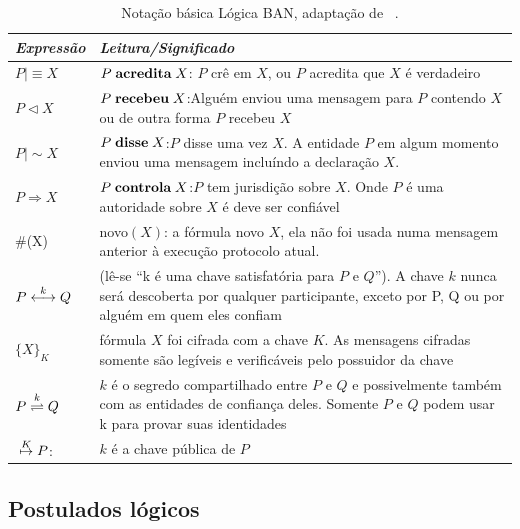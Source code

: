 \begin{table}[h]
\begin{center}
    \begin{tabular}{|l|p{10cm}|}
    \hline
    \textbf{\emph{Expressão }}         & \textbf{\emph{Leitura/Significado}}                                                                               \\ \hline
    ${P}\mid\equiv{X}$               & ${P}\mathrel{\textbf{acredita}}{X}$: $P$ crê em $X$, ou $P$ acredita que $X$ é verdadeiro \\ \hline
    ${P}\triangleleft{X}$            & ${P}\mathrel{\textbf{recebeu}}{X}$:Alguém enviou uma mensagem para $P$ contendo $X$ ou de outra forma $P$ recebeu $X$   \\ \hline
    ${P}\mid\sim{X}$                 & ${P}\mathrel{\textbf{disse}}{X}$:$P$ disse uma vez $X$. A entidade $P$ em algum momento enviou uma mensagem incluíndo a declaração $X$.\\ \hline
    ${P}\Rightarrow {X}$                 & ${P}\mathrel{\textbf{controla}}{X}$:$P$ tem jurisdição sobre $X$. Onde $P$ é uma autoridade sobre $X$ é deve ser confiável \\ \hline
    \#(X)                            & novo$(X)$: a fórmula novo $X$, ela não foi usada numa mensagem anterior à execução protocolo atual.  \\ \hline
    ${P}\stackrel{k}{\longleftrightarrow}{Q}$                & (lê-se ``k é uma chave satisfatória para $P$ e $Q$''). A chave $k$ nunca será descoberta por qualquer participante, exceto por P, Q ou por alguém em quem eles confiam \\ \hline
    $\{{X}\}_K$                  & fórmula $X$ foi cifrada com a chave $K$. As mensagens cifradas somente são legíveis e verificáveis pelo possuidor da chave \\ \hline
    ${P}\stackrel{k}{\rightleftharpoons}{Q}$         & ${k}$ é o segredo compartilhado entre ${P}$ e ${Q}$ e possivelmente também com as entidades de confiança deles. Somente ${P}$ e ${Q}$ podem usar k para provar suas identidades \\ \hline
    ${}\stackrel{K}{\mapsto}{P}$:               & ${k}$ é a chave pública de ${P}$  \\ \hline
    \end{tabular}
    \caption {Notação básica Lógica BAN, adaptação de ~\cite{Burrows1990}.}
\label{tab:notacaobasicaBAN}
\end{center}
\end{table}


\subsection{Postulados lógicos}

